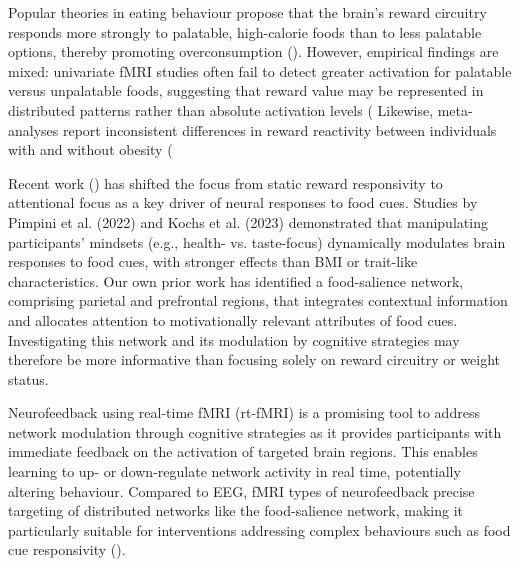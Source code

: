 \documentclass[]{imag-ms-template}
\begin{document}
Popular theories in eating behaviour propose that the brain’s reward circuitry responds more strongly to palatable, high-calorie foods than to less palatable options, thereby promoting overconsumption (\cite{hillObesityOverviewEpidemic2005}). However, empirical findings are mixed: univariate fMRI studies often fail to detect greater activation for palatable versus unpalatable foods, suggesting that reward value may be represented in distributed patterns rather than absolute activation levels (%
Likewise, meta-analyses report inconsistent differences in reward reactivity between individuals with and without obesity (%

Recent work  (\cite{frankortRewardActivitySatiated2012, franssenPowerMindAttentional2020, franssenEffectsMindsetHormonal2022, pimpiniMoreComplexYou2022, kochsItMatterPerspective2023}) has shifted the focus from static reward responsivity to attentional focus as a key driver of neural responses to food cues. Studies by Pimpini et al. (2022) and Kochs et al. (2023) demonstrated that manipulating participants’ mindsets (e.g., health- vs. taste-focus) dynamically modulates brain responses to food cues, with stronger effects than BMI or trait-like characteristics. Our own prior work has identified a food-salience network, comprising parietal and prefrontal regions, that integrates contextual information and allocates attention to motivationally relevant attributes of food cues. Investigating this network and its modulation by cognitive strategies may therefore be more informative than focusing solely on reward circuitry or weight status.

Neurofeedback using real-time fMRI (rt-fMRI) is a promising tool to address network modulation through cognitive strategies as it provides participants with immediate feedback on the activation of targeted brain regions. This enables learning to up- or down-regulate network activity in real time, potentially altering behaviour. Compared to EEG, fMRI types of neurofeedback  precise targeting of distributed networks like the food-salience network, making it particularly suitable for interventions addressing complex behaviours such as food cue responsivity (\cite{pimpiniMoreComplexYou2022, kochsItMatterPerspective2023}).
\end{document}
